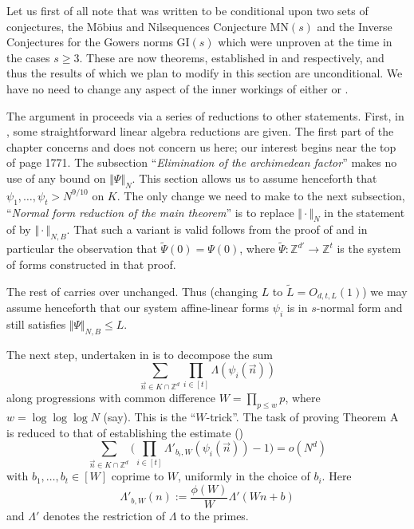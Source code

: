 \documentclass[11pt]{amsart}
\numberwithin{equation}{section}  %
\theoremstyle{remark}
\theoremstyle{plain}
\numberwithin{equation}{section}
\newcommand{\Z}{\mathbb{Z}}
\renewcommand{\leq}{\leqslant}
\renewcommand{\geq}{\geqslant}
\renewcommand{\(}{\left(}
\renewcommand{\)}{\right)}
\newcommand{\vect}[1]{{\ensuremath{\vec{#1}}}}
\begin{document}
 Let us first of all note that \cite{gt-linearprimes} was written to be conditional upon two sets of conjectures, the M\"obius and Nilsequences Conjecture $\mbox{MN}(s)$ and the Inverse Conjectures for the Gowers norms $\mbox{GI}(s)$ which were unproven at the time in the cases $s \geq 3$. These are now theorems, established in \cite{gt-nilmobius} and \cite{GTZ} respectively, and thus the results of \cite{gt-linearprimes} which we plan to modify in this section are unconditional. We have no need to change any aspect of the inner workings of either \cite{gt-nilmobius} or \cite{GTZ}.

The argument in \cite{gt-linearprimes} proceeds via a series of reductions to other statements. First, in \cite[Chapter 4]{gt-linearprimes}, some straightforward linear algebra reductions are given. The first part of the chapter concerns \cite[Theorem 1.8]{gt-linearprimes} and does not concern us here; our interest begins near the top of page 1771. The subsection ``\emph{Elimination of the archimedean factor}'' makes no use of any bound on $\Vert \Psi \Vert_N$. This section allows us to assume henceforth that $\psi_1,\dots,\psi_t > N^{9/10}$ on $K$. The only change we need to make to the next subsection, ``\emph{Normal form reduction of the main theorem}'' is to replace $\Vert \cdot \Vert_N$ in the statement of \cite[Lemma 4.4]{gt-linearprimes} by $\Vert \cdot \Vert_{N, B}$. That such a variant is valid follows from the proof of \cite[Lemma 4.4]{gt-linearprimes} and in particular the observation that $\tilde\Psi(0) = \Psi(0)$, where $\tilde\Psi : \Z^{d'} \rightarrow \Z^t$ is the system of forms constructed in that proof.


The rest of \cite[Chapter 4]{gt-linearprimes} carries over unchanged. Thus (changing $L$ to $\tilde L = O_{d,t,L}(1)$) we may assume henceforth that our system affine-linear forms $\psi_i$ is in $s$-normal form and still satisfies $\Vert \Psi \Vert_{N,B} \leq L$.


The next step, undertaken in \cite[Chapter 5]{gt-linearprimes} is to decompose the sum
\[ \sum_{\vect{n} \in K \cap \Z^d} \prod_{i \in [t]} \Lambda(\psi_i(\vect{n}))\] along progressions with common difference $W = \prod_{p \leq w} p$, where $w = \log \log \log N$ (say). This is the ``$W$-trick''. The task of proving Theorem A is reduced to that of establishing the estimate (\cite[Theorem 5.1]{gt-linearprimes})
\begin{equation*}\label{gt-51} \sum_{\vect{n} \in K \cap \Z^d} \Bigg(\prod_{i \in [t]} \Lambda'_{b_i, W}(\psi_i(\vect{n})) - 1\Bigg) = o(N^d)\end{equation*}
with $b_1,\dots,b_t \in [W]$ coprime to $W$, uniformly in the choice of $b_i$. Here
\[ \Lambda'_{b,W}(n) := \frac{\phi(W)}{W}\Lambda'(Wn + b)\] and $\Lambda'$ denotes the restriction of $\Lambda$ to the primes.
\end{document}
